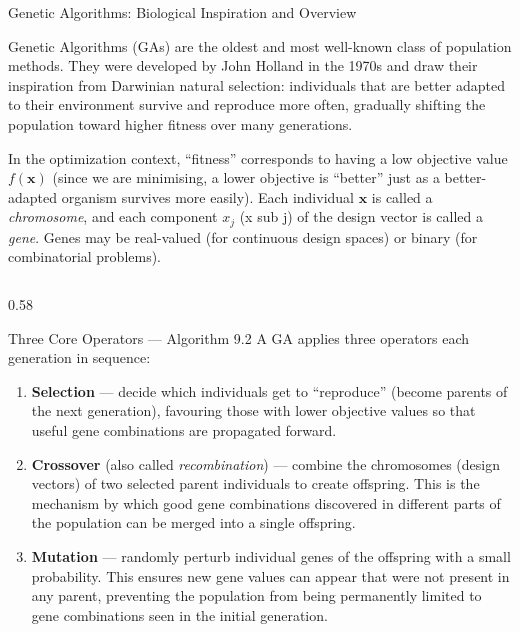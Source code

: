 \documentclass[aspectratio=169,10pt]{beamer}
\newcommand{\bx}{\mathbf{x}}
\begin{document}
\begin{frame}[allowframebreaks]{Genetic Algorithms: Biological Inspiration and Overview}

  Genetic Algorithms (GAs) are the oldest and most well-known class
  of population methods.  They were developed by John Holland in the
  1970s and draw their inspiration from Darwinian natural selection:
  individuals that are better adapted to their environment survive
  and reproduce more often, gradually shifting the population toward
  higher fitness over many generations.

  In the optimization context, ``fitness'' corresponds to having a
  low objective value $f(\bx)$ (since we are minimising, a lower
  objective is ``better'' just as a better-adapted organism survives
  more easily).  Each individual $\bx$ is called a
  \emph{chromosome}, and each component $x_j$ (x sub j) of the
  design vector is called a \emph{gene}.  Genes may be real-valued
  (for continuous design spaces) or binary (for combinatorial problems).

  \begin{columns}[T]
    \begin{column}{0.58\textwidth}
      \begin{block}{Three Core Operators --- Algorithm 9.2}
        A GA applies three operators each generation in sequence:
        \begin{enumerate}
          \item \textbf{Selection} --- decide which individuals get to
                ``reproduce'' (become parents of the next generation),
                favouring those with lower objective values so that
                useful gene combinations are propagated forward.
          \item \textbf{Crossover} (also called \emph{recombination})
                --- combine the chromosomes (design vectors) of two
                selected parent individuals to create offspring.  This
                is the mechanism by which good gene combinations
                discovered in different parts of the population can
                be merged into a single offspring.
          \item \textbf{Mutation} --- randomly perturb individual
                genes of the offspring with a small probability.
                This ensures new gene values can appear that were
                not present in any parent, preventing the population
                from being permanently limited to gene combinations
                seen in the initial generation.
        \end{enumerate}
      \end{block}


\end{column}
\end{columns}
\end{frame}
\end{document}
